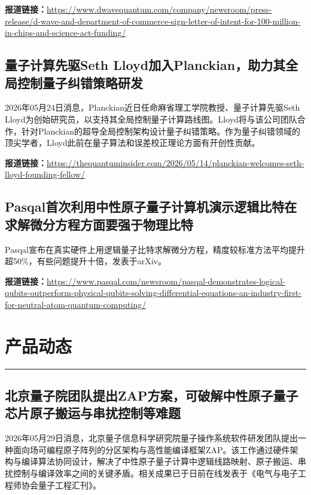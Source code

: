 \documentclass[12pt,a4paper]{ctexart}
\begin{document}
\noindent\textbf{报道链接：}\url{https://www.dwavequantum.com/company/newsroom/press-release/d-wave-and-department-of-commerce-sign-letter-of-intent-for-100-million-in-chips-and-science-act-funding/}

\subsection{ 量子计算先驱Seth Lloyd加入Planckian，助力其全局控制量子纠错策略研发 }

2026年05月24日消息，Planckian近日任命麻省理工学院教授、量子计算先驱Seth Lloyd为创始研究员，以支持其全局控制量子计算路线图。Lloyd将与该公司团队合作，针对Planckian的超导全局控制架构设计量子纠错策略。作为量子纠错领域的顶尖学者，Lloyd此前在量子算法和误差校正理论方面有开创性贡献。

\noindent\textbf{报道链接：}\url{https://thequantuminsider.com/2026/05/14/planckian-welcomes-seth-lloyd-founding-fellow/}

\subsection{ Pasqal首次利用中性原子量子计算机演示逻辑比特在求解微分方程方面要强于物理比特 }

Pasqal宣布在真实硬件上用逻辑量子比特求解微分方程，精度较标准方法平均提升超50\%，有些问题提升十倍，发表于arXiv。

\noindent\textbf{报道链接：}\url{https://www.pasqal.com/newsroom/pasqal-demonstrates-logical-qubits-outperform-physical-qubits-solving-differential-equations-an-industry-first-for-neutral-atom-quantum-computing/}


\newpage
\section{产品动态}
\vspace{-0.5em}
\noindent\rule{\linewidth}{1.5pt}

\subsection{ 北京量子院团队提出ZAP方案，可破解中性原子量子芯片原子搬运与串扰控制等难题 }

2026年05月29日消息，北京量子信息科学研究院量子操作系统软件研发团队提出一种面向场可编程原子阵列的分区架构与高性能编译框架ZAP。该工作通过硬件架构与编译算法协同设计，解决了中性原子量子计算中逻辑线路映射、原子搬运、串扰控制与编译效率之间的关键矛盾。相关成果已于日前在线发表于《电气与电子工程师协会量子工程汇刊》。
\end{document}
